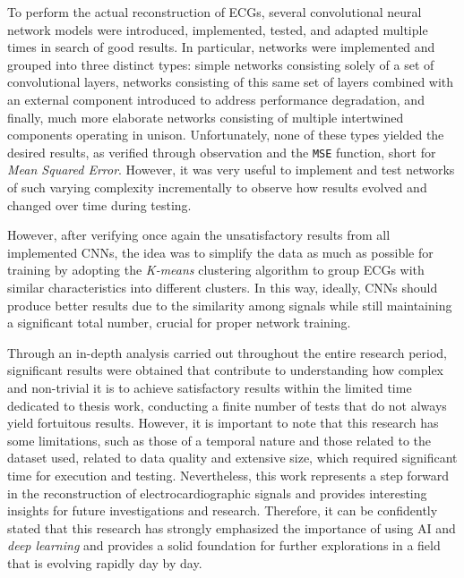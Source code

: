 \documentclass[12pt,english]{report}
\newcommand\blankpage{
    \null
    \thispagestyle{empty}
    \addtocounter{page}{-1}
    \newpage}
\begin{document}
To perform the actual reconstruction of ECGs, several convolutional neural network models were introduced, implemented, tested, and adapted multiple times in search of good results. In particular, networks were implemented and grouped into three distinct types: simple networks consisting solely of a set of convolutional layers, networks consisting of this same set of layers combined with an external component introduced to address performance degradation, and finally, much more elaborate networks consisting of multiple intertwined components operating in unison. Unfortunately, none of these types yielded the desired results, as verified through observation and the \texttt{MSE} function, short for \textit{Mean Squared Error}. However, it was very useful to implement and test networks of such varying complexity incrementally to observe how results evolved and changed over time during testing.

However, after verifying once again the unsatisfactory results from all implemented CNNs, the idea was to simplify the data as much as possible for training by adopting the \textit{K-means} clustering algorithm to group ECGs with similar characteristics into different clusters. In this way, ideally, CNNs should produce better results due to the similarity among signals while still maintaining a significant total number, crucial for proper network training.

Through an in-depth analysis carried out throughout the entire research period, significant results were obtained that contribute to understanding how complex and non-trivial it is to achieve satisfactory results within the limited time dedicated to thesis work, conducting a finite number of tests that do not always yield fortuitous results. However, it is important to note that this research has some limitations, such as those of a temporal nature and those related to the dataset used, related to data quality and extensive size, which required significant time for execution and testing. Nevertheless, this work represents a step forward in the reconstruction of electrocardiographic signals and provides interesting insights for future investigations and research. Therefore, it can be confidently stated that this research has strongly emphasized the importance of using AI and \textit{deep learning} and provides a solid foundation for further explorations in a field that is evolving rapidly day by day.

\afterpage{\blankpage}




\afterpage{\blankpage}
\end{document}
